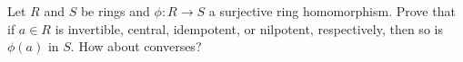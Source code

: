 Let $R$ and $S$ be rings and $\phi: R \rightarrow S$ a surjective ring homomorphism. Prove that if $a \in R$ is invertible, central, idempotent, or nilpotent, respectively, then so is $\phi(a)$ in $S$. How about converses?
